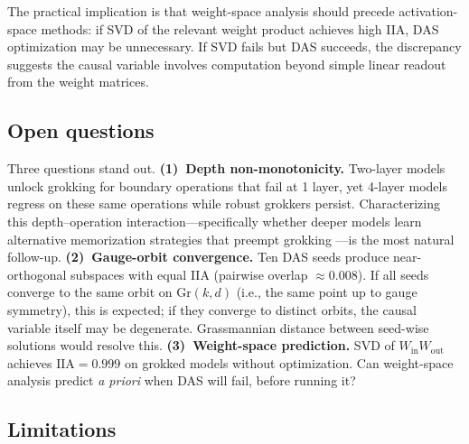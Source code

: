 \documentclass{article}
\newcommand{\Gr}{\mathrm{Gr}}
\newcommand{\IIA}{\mathrm{IIA}}
\begin{document}
The practical implication is that weight-space analysis should precede
activation-space methods: if SVD of the relevant weight product achieves
high IIA, DAS optimization may be unnecessary. If SVD fails but DAS
succeeds, the discrepancy suggests the causal variable involves
computation beyond simple linear readout from the weight matrices.

\subsection{Open questions}

Three questions stand out.
\textbf{(1)~Depth non-monotonicity.}
Two-layer models unlock grokking for boundary operations that fail at 1 layer,
yet 4-layer models regress on these same operations while robust grokkers
persist. Characterizing this depth--operation interaction---specifically
whether deeper models learn alternative memorization strategies that
preempt grokking \citep{arpit2017closer}---is the most natural follow-up.
\textbf{(2)~Gauge-orbit convergence.}
Ten DAS seeds produce near-orthogonal subspaces with equal IIA (pairwise
overlap $\approx 0.008$). If all seeds converge to the same orbit on
$\Gr(k,d)$ (i.e., the same point up to gauge symmetry), this is expected;
if they converge to distinct orbits, the causal variable itself may be
degenerate. Grassmannian distance between seed-wise solutions would
resolve this.
\textbf{(3)~Weight-space prediction.}
SVD of $W_\text{in} W_\text{out}$ achieves $\IIA = 0.999$ on grokked
models without optimization. Can weight-space analysis predict \emph{a
priori} when DAS will fail, before running it?

\subsection{Limitations}
\label{sec:limitations}
\end{document}

